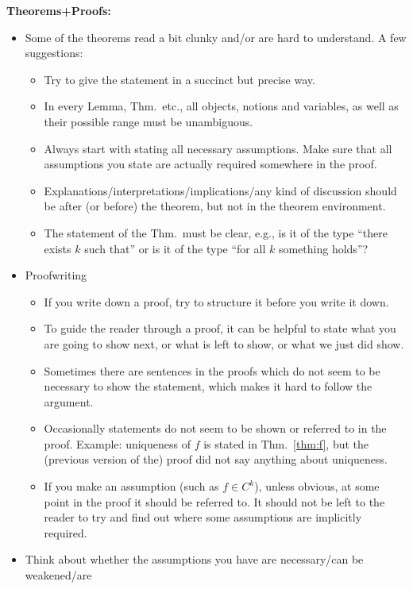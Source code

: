 {{\bf Theorems+Proofs:}
\begin{itemize}
    \item Some of the theorems read a bit clunky and/or are hard
    to understand. A few suggestions:
    \begin{itemize}
    \item Try to give the statement in a succinct but precise way.
    \item In every Lemma, Thm.\ etc., all objects, notions and
      variables, as well as their possible range must be unambiguous.
    \item Always start with stating all necessary assumptions.  Make
      sure that all assumptions you state are actually required
      somewhere in the proof.
    \item Explanations/interpretations/implications/any kind of discussion
      should be after (or before) the theorem, but
      not in the theorem environment.
    \item The statement of the Thm.\ must be clear,
    e.g., is it of the type ``there exists $k$ such that'' or is it of
    the type ``for all $k$ something holds''?
  \end{itemize}
  \item Proofwriting
    \begin{itemize}
    \item If you write down a proof, try to structure it before you
      write it down.
    \item To guide the reader through a proof, it can be helpful to
      state what you are going to show next, or what is left to show,
      or what we just did show.
  \item Sometimes there are sentences in the proofs which do not seem to
    be necessary to show the statement, which makes it hard to follow
    the argument.
  \item Occasionally statements do not seem to be shown or referred to
    in the proof. Example: uniqueness of $f$ is stated in
    Thm.~\ref{thm:f}, but the (previous version of the) proof did not
    say anything about uniqueness.
  \item If you make an assumption (such as $f\in C^k$), unless
    obvious, at some point in the proof it should be referred to. It
    should not be left to the reader to try and find out where some
    assumptions are implicitly required.
  \end{itemize}  
  \item Think about whether
    the assumptions you have are necessary/can be weakened/are

\end{itemize}}
